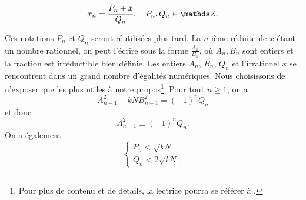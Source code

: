 \begin{equation}
	x_n = \frac{P_n + x}{Q_n}, \quad P_n, Q_n \in \Z.
\end{equation}

Ces notations $P_n$ et $Q_n$ seront réutilisées plus tard. La $n$-ième réduite
de $x$ étant un nombre rationnel, on peut l'écrire sous la forme
$\frac{A_n}{B_n}$, où $A_n, B_n$ sont entiers et la fraction est irréductible
bien définie. Les entiers $A_n$, $B_n$, $Q_n$ et l'irrationel $x$ se
rencontrent dans un grand nombre d'égalités numériques. Nous choisissons de
n'exposer que les plus utiles à notre propos\footnote{Pour plus de contenu et
de détails, la lectrice pourra se référer à .}. Pour tout $n\geqslant
1$, on a \[A_{n-1}^2 - kN B_{n-1}^2 = (-1)^n Q_n\] et donc
\begin{equation}
	A_{n-1}^2 \equiv (-1)^n Q_n.
\end{equation}
On a également
\begin{equation}
	\begin{cases}
		P_n < \sqrt{kN} \\
		Q_n < 2\sqrt{kN}.
	\end{cases}
\end{equation}
